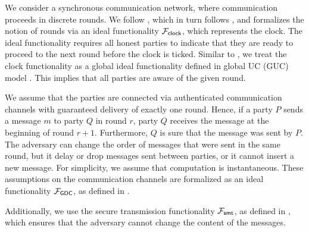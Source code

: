 We consider a synchronous communication network, where communication proceeds in discrete 
rounds. We follow \cite{kmtz}, which in turn follows \cite{mpvsc}, and formalizes the notion of 
rounds via an ideal functionality $\mathcal{F}_{\mathsf{clock}}$, which represents the clock. The ideal 
functionality requires all honest parties to indicate that they are ready to proceed to the next 
round before the clock is ticked. Similar to \cite{mpvsc}, we treat the clock functionality as a 
global ideal functionality defined in global UC (GUC) model \cite{guc}. This implies that all 
parties are aware of the given round. 

We assume that the parties are connected via authenticated communication channels with guaranteed 
delivery of exactly one round. Hence, if a party $P$ sends a message $m$ to party $Q$ in round 
$r$, party $Q$ receives the message at the beginning of round $r + 1$. Furthermore, $Q$ is sure 
that the message was sent by $P$. The adversary can change the order of messages that were sent 
in the same round, but it delay or drop messages sent between parties, or it cannot insert a 
new message. For simplicity, we assume that computation is instantaneous. These assumptions on 
the communication channels are formalized as an ideal functionality $\mathcal{F}_{\mathsf{GDC}}$, as 
defined in \cite{mpvsc}.

Additionally, we use the secure transmission functionality $\mathcal{F}_{\mathsf{smt}}$, as defined in 
\cite{canetti}, which ensures that the adversary cannot change the content of the messages.


